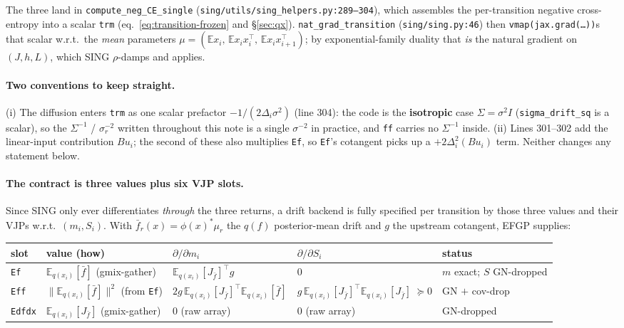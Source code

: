 \documentclass[11pt]{article}
\newcommand{\E}{\mathbb{E}}
\newcommand{\Eqx}{\mathbb{E}_{q(x_i)}}
\newcommand{\code}[1]{\texttt{\small #1}}
\begin{document}
\noindent
The three land in \code{compute\_neg\_CE\_single}
(\code{sing/utils/sing\_helpers.py:289--304}), which assembles the
per-transition negative cross-entropy into a scalar \code{trm}
(eq.~\ref{eq:transition-frozen} and \S\ref{sec:qx}).
\code{nat\_grad\_transition} (\code{sing/sing.py:46}) then
\code{vmap(jax.grad(\ldots))}s that scalar w.r.t.\ the \emph{mean}
parameters $\mu=(\E x_i,\, \E x_i x_i^\top,\, \E x_i x_{i+1}^\top)$;
by exponential-family duality that \emph{is} the natural gradient on
$(J,h,L)$, which SING $\rho$-damps and applies.

\paragraph{Two conventions to keep straight.}
(i) The diffusion enters \code{trm} as one scalar prefactor
$-1/(2\Delta_i\sigma^2)$ (line 304): the code is the \textbf{isotropic}
case $\Sigma=\sigma^2 I$ (\code{sigma\_drift\_sq} is a scalar), so the
$\Sigma^{-1}$ / $\sigma_r^{-2}$ written throughout this note is a single
$\sigma^{-2}$ in practice, and \code{ff} carries no $\Sigma^{-1}$ inside.
(ii) Lines 301--302 add the linear-input contribution $Bu_i$; the second
of these also multiplies \code{Ef}, so \code{Ef}'s cotangent picks up a
$+2\Delta_i^2 (Bu_i)$ term. Neither changes any statement below.

\paragraph{The contract is three values plus six VJP slots.}
Since SING only ever differentiates \emph{through} the three returns, a
drift backend is fully specified per transition by those three values
and their VJPs w.r.t.\ $(m_i,S_i)$. With
$\bar f_r(x)=\phi(x)^*\mu_r$ the $q(f)$ posterior-mean drift and $g$ the
upstream cotangent, EFGP supplies:

\begin{center}
\renewcommand{\arraystretch}{1.35}
\footnotesize
\begin{tabular}{@{}p{1.4cm}|p{3.5cm}|p{3.3cm}|p{4.1cm}|p{2.5cm}@{}}
\hline
slot & value (how) & $\partial/\partial m_i$ & $\partial/\partial S_i$ & status \\\hline
\code{Ef}
 & $\Eqx[\bar f]$ (gmix-gather)
 & $\Eqx[J_{\bar f}]^\top g$
 & $0$
 & $m$ exact; $S$ GN-dropped \\
\code{Eff}
 & $\|\Eqx[\bar f]\|^2$ (from \code{Ef})
 & $2g\,\Eqx[J_{\bar f}]^\top\Eqx[\bar f]$
 & $g\,\Eqx[J_{\bar f}]^\top\Eqx[J_{\bar f}]\;\succeq 0$
 & GN $+$ cov-drop \\
\code{Edfdx}
 & $\Eqx[J_{\bar f}]$ (gmix-gather)
 & $0$ (raw array)
 & $0$ (raw array)
 & GN-dropped \\\hline
\end{tabular}
\end{center}
\end{document}
